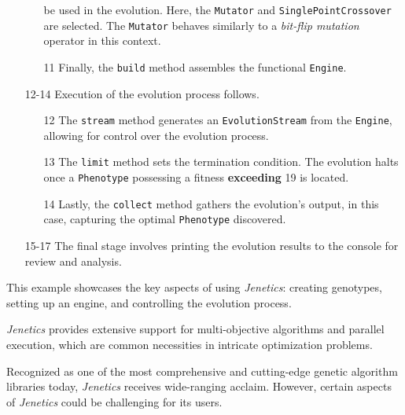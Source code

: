 \begin{enumerate}
\begin{enumerate}
          be used in the evolution.
          Here, the \texttt{Mutator} and \texttt{SinglePointCrossover} are 
          selected.
          The \texttt{Mutator} behaves similarly to a \textit{bit-flip 
          mutation} operator in this context.
        \item[11] Finally, the \texttt{build} method assembles the functional 
          \texttt{Engine}.
      \end{enumerate}
    \item[12-14] Execution of the evolution process follows.
      \begin{enumerate}
        \item[12] The \texttt{stream} method generates an 
          \texttt{EvolutionStream} from the \texttt{Engine}, allowing for 
          control over the evolution process.
        \item[13] The \texttt{limit} method sets the termination condition.
          The evolution halts once a \texttt{Phenotype} possessing a fitness 
          \textbf{exceeding} 19 is located.
        \item[14] Lastly, the \texttt{collect} method gathers the evolution's 
          output, in this case, capturing the optimal \texttt{Phenotype} 
          discovered.
      \end{enumerate}
    \item[15-17] The final stage involves printing the evolution results to the 
      console for review and analysis.
  \end{enumerate}

  This example showcases the key aspects of using \textit{Jenetics}: creating 
  genotypes, setting up an engine, and controlling the evolution process.

  \textit{Jenetics} provides extensive support for multi-objective algorithms 
  and parallel execution, which are common necessities in intricate optimization
  problems.

  Recognized as one of the most comprehensive and cutting-edge genetic algorithm libraries today, \textit{Jenetics} receives wide-ranging acclaim. However, certain aspects of \textit{Jenetics} could be challenging for its users.

